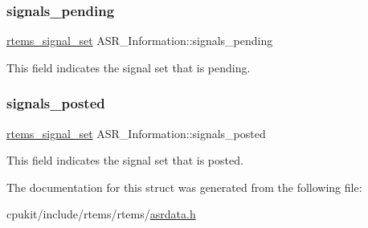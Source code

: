 \subsubsection{\texorpdfstring{signals\_pending}{signals\_pending}}
{\footnotesize\ttfamily \mbox{\hyperlink{group__ClassicASR_gae494c868e6d04d19b2f403bb51de98eb}{rtems\+\_\+signal\+\_\+set}} A\+S\+R\+\_\+\+Information\+::signals\+\_\+pending}

This field indicates the signal set that is pending. \mbox{\label{structASR__Information_a083c9a2c791d173df462686b69816583}} 
\subsubsection{\texorpdfstring{signals\_posted}{signals\_posted}}
{\footnotesize\ttfamily \mbox{\hyperlink{group__ClassicASR_gae494c868e6d04d19b2f403bb51de98eb}{rtems\+\_\+signal\+\_\+set}} A\+S\+R\+\_\+\+Information\+::signals\+\_\+posted}

This field indicates the signal set that is posted. 

The documentation for this struct was generated from the following file\+:\begin{DoxyCompactItemize}
\item 
cpukit/include/rtems/rtems/\mbox{\hyperlink{asrdata_8h}{asrdata.\+h}}\end{DoxyCompactItemize}
